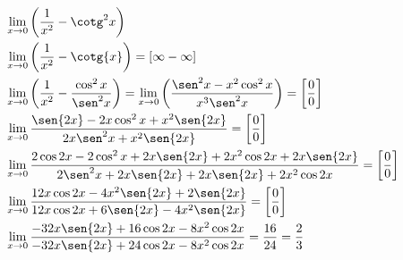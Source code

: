 \begin{ex}
\begin{align}
&\lim_{x\rightarrow 0} \left(\frac{1}{x^2}-\cotg^2{x}\right)\nonumber\\
&\lim_{x\rightarrow 0} \left(\frac{1}{x^2}-\cotg{x}\right)=[\infty-\infty]\nonumber\\
&\lim_{x\rightarrow 0} \left(\frac{1}{x^2}-\frac{\cos^2{x}}{\sen^2{x}}\right)=\lim_{x\rightarrow 0} \left(\frac{\sen^2{x}-x^2\cos^2{x}}{x^3\sen^2{x}}\right)=\left[\frac{0}{0}\right]\nonumber\\
&\lim_{x\rightarrow 0} \frac{\sen{2x}-2x\cos^2{x}+x^2\sen{2x}}{2x\sen^2{x}+x^2\sen{2x}}=\left[\frac{0}{0}\right]\nonumber\\
&\lim_{x\rightarrow 0} \frac{2\cos{2x}-2\cos^2{x}+2x\sen{2x}+2x^2\cos{2x}+2x\sen{2x}}{2\sen^2{x}+2x\sen{2x}+2x\sen{2x}+2x^2\cos{2x}}=\left[\frac{0}{0}\right]\nonumber\\
&\lim_{x\rightarrow 0} \frac{12x\cos{2x}-4x^2\sen{2x}+2\sen{2x}}{12x\cos{2x}+6\sen{2x}-4x^2\sen{2x}}=\left[\frac{0}{0}\right]\nonumber\\
&\lim_{x\rightarrow 0} \frac{-32x\sen{2x}+16\cos{2x}-8x^2\cos{2x}}{-32x\sen{2x}+24\cos{2x}-8x^2\cos{2x}}=\frac{16}{24}=\frac{2}{3}\nonumber
\end{align}
\end{ex}
